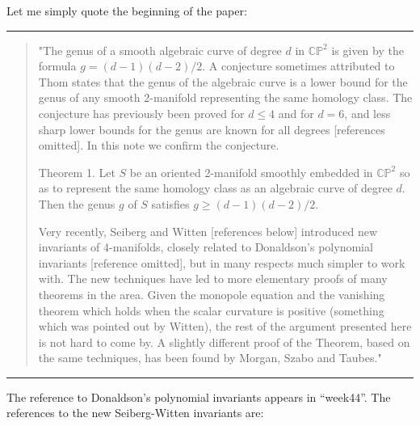 \documentclass{article}
\renewcommand{\texttt}[1]{%
  \begingroup
  \ttfamily
  \begingroup\lccode`~=`/\lowercase{\endgroup\def~}{/\discretionary{}{}{}}%
  \begingroup\lccode`~=`[\lowercase{\endgroup\def~}{[\discretionary{}{}{}}%
  \begingroup\lccode`~=`.\lowercase{\endgroup\def~}{.\discretionary{}{}{}}%
  \catcode`/=\active\catcode`[=\active\catcode`.=\active
  \scantokens{#1\noexpand}%
  \endgroup
}
\begin{document}
Let me simply quote the beginning of the paper:

\begin{center}\rule{0.5\linewidth}{0.5pt}\end{center}

\begin{quote}
"The genus of a smooth algebraic curve of degree \(d\) in
\(\mathbb{CP}^2\) is given by the formula \(g = (d-1)(d-2)/2\). A
conjecture sometimes attributed to Thom states that the genus of the
algebraic curve is a lower bound for the genus of any smooth 2-manifold
representing the same homology class. The conjecture has previously been
proved for \(d \leqslant 4\) and for \(d = 6\), and less sharp lower
bounds for the genus are known for all degrees {[}references omitted{]}.
In this note we confirm the conjecture.

Theorem 1. Let \(S\) be an oriented 2-manifold smoothly embedded in
\(\mathbb{CP}^2\) so as to represent the same homology class as an
algebraic curve of degree \(d\). Then the genus \(g\) of \(S\) satisfies
\(g \geqslant (d-1)(d-2)/2\).

Very recently, Seiberg and Witten {[}references below{]} introduced new
invariants of 4-manifolds, closely related to Donaldson's polynomial
invariants {[}reference omitted{]}, but in many respects much simpler to
work with. The new techniques have led to more elementary proofs of many
theorems in the area. Given the monopole equation and the vanishing
theorem which holds when the scalar curvature is positive (something
which was pointed out by Witten), the rest of the argument presented
here is not hard to come by. A slightly different proof of the Theorem,
based on the same techniques, has been found by Morgan, Szabo and
Taubes."
\end{quote}

\begin{center}\rule{0.5\linewidth}{0.5pt}\end{center}

The reference to Donaldson's polynomial invariants appears in
``week44''. The references to the new Seiberg-Witten invariants are:

\end{document}
